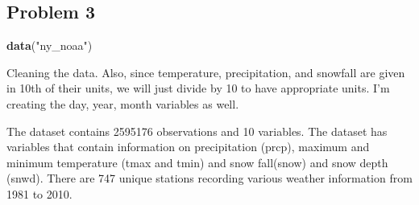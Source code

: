 \documentclass[]{article}
\newenvironment{Shaded}{\begin{snugshade}}{\end{snugshade}}
\newcommand{\KeywordTok}[1]{\textcolor[rgb]{0.13,0.29,0.53}{\textbf{#1}}}
\newcommand{\DataTypeTok}[1]{\textcolor[rgb]{0.13,0.29,0.53}{#1}}
\newcommand{\DecValTok}[1]{\textcolor[rgb]{0.00,0.00,0.81}{#1}}
\newcommand{\StringTok}[1]{\textcolor[rgb]{0.31,0.60,0.02}{#1}}
\newcommand{\OtherTok}[1]{\textcolor[rgb]{0.56,0.35,0.01}{#1}}
\newcommand{\OperatorTok}[1]{\textcolor[rgb]{0.81,0.36,0.00}{\textbf{#1}}}
\newcommand{\NormalTok}[1]{#1}
\begin{document}
\subsection{Problem 3}\label{problem-3}

\begin{Shaded}
\begin{Highlighting}[]
\KeywordTok{data}\NormalTok{(}\StringTok{"ny_noaa"}\NormalTok{)}
\end{Highlighting}
\end{Shaded}

Cleaning the data. Also, since temperature, precipitation, and snowfall
are given in 10th of their units, we will just divide by 10 to have
appropriate units. I'm creating the day, year, month variables as well.

\begin{Shaded}
\end{Shaded}

The dataset contains 2595176 observations and 10 variables. The dataset
has variables that contain information on precipitation (prcp), maximum
and minimum temperature (tmax and tmin) and snow fall(snow) and snow
depth (snwd). There are 747 unique stations recording various weather
information from 1981 to 2010.

\begin{Shaded}
\end{Shaded}
\end{document}
